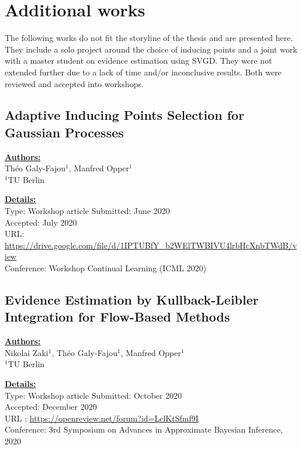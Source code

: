 \chapter{Additional works} 
\label{appendix:worshoppapers}
The following works do not fit the storyline of the thesis and are presented here.
They include a solo project around the choice of inducing points and a joint work with a master student on evidence estimation using \ac{SVGD}.
They were not extended further due to a lack of time and/or inconclusive results.
Both were reviewed and accepted into workshops.


\section{Adaptive Inducing Points Selection for Gaussian Processes}

\textbf{\underline{Authors:}}\\
Th\'eo Galy-Fajou$^1$, Manfred Opper$^1$\\
\small{$^1$TU Berlin}

\textbf{\underline{Details:}}\\
Type: Workshop article
Submitted: June 2020\\
Accepted: July 2020\\
URL: \url{https://drive.google.com/file/d/1IPTUBfY_b2WElTWBIVU4lrbHcXnbTWdB/view}\\
Conference: Workshop Continual Learning (ICML 2020)\\




\section{Evidence Estimation by Kullback-Leibler Integration for Flow-Based Methods}

\textbf{\underline{Authors:}}\\
Nikolai Zaki$^1$, Th\'eo Galy-Fajou$^1$, Manfred Opper$^1$\\
\small{$^1$TU Berlin}

\textbf{\underline{Details:}}\\
Type: Workshop article
Submitted: October 2020\\
Accepted: December 2020\\
URL : \url{https://openreview.net/forum?id=LclKtSfmf9I}\\
Conference: 3rd Symposium on Advances in Approximate Bayesian Inference, 2020\\


